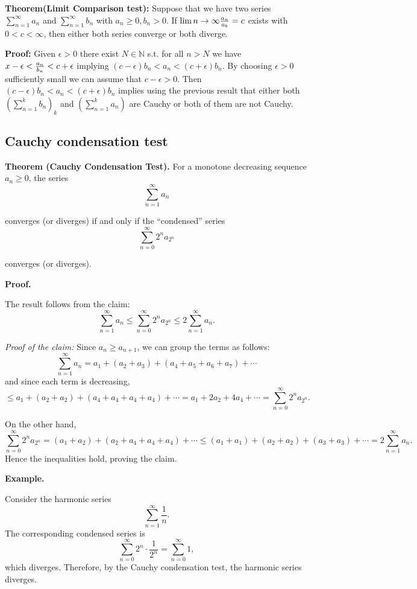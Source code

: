 \documentclass{article}
\begin{document}
\textbf{Theorem(Limit Comparison test):} Suppose that we have two series $\sum_{n=1}^{\infty}{a_n}$ and $\sum_{n=1}^{\infty}{b_n}$ with $a_n\geq 0, b_n > 0$. If $\lim{n\to \infty}{a_n\over a_b}=c$ exists with $0<c<\infty$, then either both series converge or both diverge.

\textbf{Proof:} Given $\epsilon > 0$ there exist $N\in \mathbb{N}$ s.t. for all $n>N$ we have $x-\epsilon <{a_n\over b_n} < c + \epsilon$ implying $(c-\epsilon)b_n<a_n<(c+\epsilon)b_n$. By choosing $\epsilon>0$ sufficiently small we can assume that $c-\epsilon >0$. Then $(c-\epsilon)b_n<a_n<(c+\epsilon)b_n$ implies using the previous result that either both $(\sum_{n=1}^{k}{b_n})_k$ and $(\sum_{n=1}^{k}{a_n})$ are Cauchy or both of them are not Cauchy.

\subsection{Cauchy condensation test}
\textbf{Theorem (Cauchy Condensation Test).}
For a monotone decreasing sequence \( a_n \ge 0 \), the series 
\[
\sum_{n=1}^{\infty} a_n
\]

converges (or diverges) if and only if the “condensed” series
\[
\sum_{n=0}^{\infty} 2^n a_{2^n}
\]

converges (or diverges).

\textbf{Proof.}

The result follows from the claim:
\[
\sum_{n=1}^{\infty} a_n 
\le 
\sum_{n=0}^{\infty} 2^n a_{2^n}
\le 
2\sum_{n=1}^{\infty} a_n.
\]

\textit{Proof of the claim:}
Since \( a_n \ge a_{n+1} \), we can group the terms as follows:
\[
\sum_{n=1}^{\infty} a_n 
= a_1 + (a_2 + a_3) + (a_4 + a_5 + a_6 + a_7) + \cdots
\]
and since each term is decreasing,
\[
\le a_1 + (a_2 + a_2) + (a_4 + a_4 + a_4 + a_4) + \cdots
= a_1 + 2a_2 + 4a_4 + \cdots
= \sum_{n=0}^{\infty} 2^n a_{2^n}.
\]

On the other hand,
\[
\sum_{n=0}^{\infty} 2^n a_{2^n}
= (a_1 + a_2) + (a_2 + a_4 + a_4 + a_4) + \cdots
\le (a_1 + a_1) + (a_2 + a_2) + (a_3 + a_3) + \cdots
= 2\sum_{n=1}^{\infty} a_n.
\]
Hence the inequalities hold, proving the claim.


\textbf{Example.}

Consider the harmonic series
\[
\sum_{n=1}^{\infty} \frac{1}{n}.
\]
The corresponding condensed series is
\[
\sum_{n=0}^{\infty} 2^n \cdot \frac{1}{2^n} = \sum_{n=0}^{\infty} 1,
\]
which diverges. Therefore, by the Cauchy condensation test, the harmonic series diverges.
\end{document}
